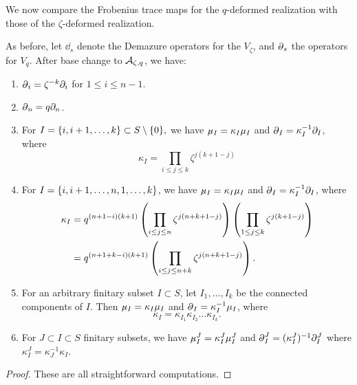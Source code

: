 We now compare the Frobenius trace maps for the $q$-deformed realization with those of the $\zeta$-deformed realization.
\begin{lemma}\label{lemma comparing Frobenius structures q vs zeta}
As before, let $\dd_s$ denote the Demazure operators  for the $V_\zeta$, and $\ddq_s$ the operators for $V_q$. After base change to $\mathcal{A}_{\zeta,q}$, we have:
    \begin{enumerate}
        \item $\ddq_i=\zeta^{-k}\dd_i$ for $1 \leq i \leq n-1$.
        \item $\ddq_n=q\dd_n$.
        \item For $I=\{i,i+1, \ldots,k\} \subset S \setminus \{0\},$ we 
        have $\procopdtq_I= \kappa_I \mu_I$ and $\ddq_I=\kappa_I^{-1}\dd_I$, where
        $$\kappa_I= \displaystyle \prod_{i\leq j \leq k}\zeta^{j(k+1-j)}$$
        \item For $I = \{i, i+1, \ldots, n, 1, \ldots, k\}$, we have
        $\procopdtq_I= \kappa_I \mu_I$ and $\ddq_I=\kappa_I^{-1}\dd_I$, where
        \begin{align}\label{eqn 1 lemma comparing Frobenius structures q vs zeta}
        \notag \kappa_I &= q^{(n+1-i)(k+1)}\left(\prod_{i\leq j \leq n}\zeta^{j(n+k+1-j)}\right)\left( \prod_{1\leq j\leq k}\zeta^{j(k+1-j)}\right)\\
        &=q^{(n+1+k-i)(k+1)}\left(\prod_{i \leq j \leq n+k} \zeta^{j(n+k+1-j)}\right).
        \end{align}
        \item For an arbitrary finitary subset $I \subset S$, let $I_1, \ldots , I_k$ be the connected components of $I$.
        Then $\procopdtq_I=\kappa_I\mu_I$ and $\ddq_I=\kappa_I^{-1}\mu_I$, where $$\kappa_I=\kappa_{I_1}\kappa_{I_2}\ldots \kappa_{I_k}.$$
        \item For $J\subset I \subset S$ finitary subsets, we have $\procopdtq_I^J= \kappa_I^J \mu_I^J$ and $\ddq_I^J=(\kappa_I^J)^{-1}\dd_I^J$ where $\kappa_I^J=\kappa_J^{-1}\kappa_I.$
    \end{enumerate}
\end{lemma}
\begin{proof}
These are all straightforward computations.
\end{proof}

